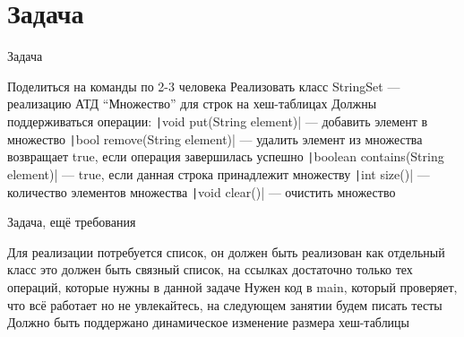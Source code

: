 \documentclass{../../slides-style}
\begin{document}
    \section{Задача}

    \begin{frame}[fragile]{Задача}
        \begin{outline}
            \1 Поделиться на команды по 2-3 человека
            \1 Реализовать класс StringSet --- реализацию АТД \enquote{Множество} для строк на хеш-таблицах
            \1 Должны поддерживаться операции:
                \2 \texttt|void put(String element)| --- добавить элемент в множество
                \2 \texttt|bool remove(String element)| --- удалить элемент из множества 
                    \3 возвращает true, если операция завершилась успешно
                \2 \texttt|boolean contains(String element)| --- true, если данная строка принадлежит множеству
                \2 \texttt|int size()| --- количество элементов множества
                \2 \texttt|void clear()| --- очистить множество
        \end{outline}
    \end{frame}

    \begin{frame}[fragile]{Задача, ещё требования}
        \begin{outline}
            \1 Для реализации потребуется список, он должен быть реализован как отдельный класс
                \2 это должен быть связный список, на ссылках
                \2 достаточно только тех операций, которые нужны в данной задаче
            \1 Нужен код в main, который проверяет, что всё работает
                \2 но не увлекайтесь, на следующем занятии будем писать тесты
            \1 Должно быть поддержано динамическое изменение размера хеш-таблицы
        \end{outline}
    \end{frame}
\end{document}
